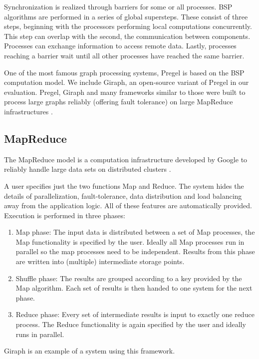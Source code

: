 Synchronization is realized through barriers for some or all processes.
BSP algorithms are performed in a series of global supersteps. These consist of three steps, beginning with the processors performing local computations concurrently.
This step can overlap with the second, the communication between components. Processes can exchange information to access remote data.
Lastly, processes reaching a barrier wait until all other processes have reached the same barrier.

One of the most famous graph processing systems, Pregel \cite{pregel} is based on the BSP computation model. We include Giraph, an open-source variant of Pregel in our evaluation.
Pregel, Giraph and many frameworks similar to those were built to process large graphs reliably (offering fault tolerance) on large MapReduce infrastructures \cite{Giraph,graphx,powergraph}.

\subsection{MapReduce}
The MapReduce model is a computation infrastructure developed by Google to reliably handle large data sets on distributed clusters \cite{mapreduce}.

A user specifies just the two functions Map and Reduce.
The system hides the details of parallelization, fault-tolerance, data distribution and load balancing away from the application logic.
All of these features are automatically provided.
Execution is performed in three phases:
\begin{enumerate}
	\item Map phase: The input data is distributed between a set of Map processes, the Map functionality is specified by the user. Ideally all Map processes run in parallel so the map processes need to be independent. Results from this phase are written into (multiple) intermediate storage points.
	\item Shuffle phase: The results are grouped according to a key provided by the Map algorithm. Each set of results is then handed to one system for the next phase.
	\item Reduce phase: Every set of intermediate results is input to exactly one reduce process. The Reduce functionality is again specified by the user and ideally runs in parallel.
\end{enumerate}
Giraph \cite{Giraph} is an example of a system using this framework.

